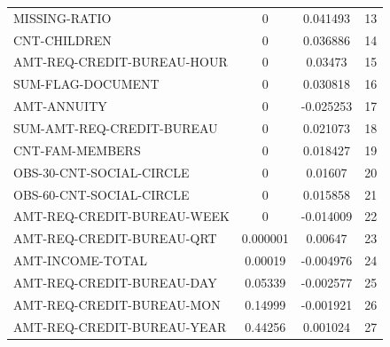 \begin{table} [h]
{\begin{tabular}{lccc}
    MISSING-RATIO              & 0        &  0.041493 & 13\\\rowcolor{bubbles}
    CNT-CHILDREN               & 0        &  0.036886 & 14\\\rowcolor{mistyrose}
    AMT-REQ-CREDIT-BUREAU-HOUR & 0        &  0.03473  & 15\\\rowcolor{bubbles}
    SUM-FLAG-DOCUMENT          & 0        &  0.030818 & 16\\\rowcolor{mistyrose}
    AMT-ANNUITY                & 0        & -0.025253 & 17\\\rowcolor{bubbles}
    SUM-AMT-REQ-CREDIT-BUREAU  & 0        &  0.021073 & 18\\\rowcolor{mistyrose}
    CNT-FAM-MEMBERS            & 0        &  0.018427 & 19\\\rowcolor{bubbles}
    OBS-30-CNT-SOCIAL-CIRCLE   & 0        &  0.01607  & 20\\\rowcolor{mistyrose}
    OBS-60-CNT-SOCIAL-CIRCLE   & 0        &  0.015858 & 21\\\rowcolor{bubbles}
    AMT-REQ-CREDIT-BUREAU-WEEK & 0        & -0.014009 & 22\\\rowcolor{mistyrose}
    AMT-REQ-CREDIT-BUREAU-QRT  & 0.000001 &  0.00647  & 23\\\rowcolor{bubbles}
    AMT-INCOME-TOTAL           & 0.00019  & -0.004976 & 24\\\rowcolor{mistyrose}
    AMT-REQ-CREDIT-BUREAU-DAY  & 0.05339  & -0.002577 & 25\\\rowcolor{bubbles}
    AMT-REQ-CREDIT-BUREAU-MON  & 0.14999  & -0.001921 & 26\\\rowcolor{mistyrose}
    AMT-REQ-CREDIT-BUREAU-YEAR & 0.44256  &  0.001024 & 27\\\hline
    \end{tabular}
    }
\end{table}

